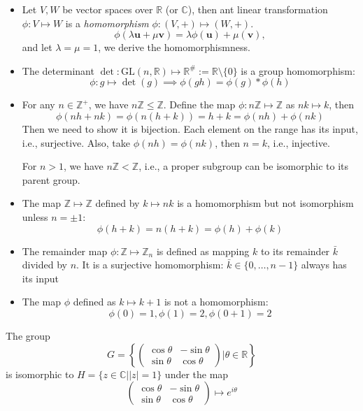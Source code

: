 \begin{example}
\begin{itemize}
\item
Let $V,W$ be vector spaces over $\mathbb{R}$ (or $\mathbb{C}$), then ant linear transformation $\phi: V\mapsto W$ is a \emph{homomorphism} $\phi: (V,+)\mapsto (W,+)$.
\[
\phi(\lambda\bm u+\mu\bm v) = \lambda\phi(\bm u)+\mu(\bm v),
\]
and let $\lambda=\mu=1$, we derive the homomorphismness.
\item
The determinant $\det:\mbox{GL}(n,\mathbb{R})\mapsto\mathbb{R}^{\#}:=\mathbb{R}\setminus\{0\}$ is a group homomorphism:
\[
\phi:g\mapsto\det(g)\implies
\phi(gh)=\phi(g)*\phi(h)
\]
\item
For any $n\in\mathbb{Z}^+$, we have $n\mathbb{Z}\le\mathbb{Z}$. Define the map $\phi:n\mathbb{Z}\mapsto\mathbb{Z}$ as $nk\mapsto k$, then
\[
\phi(nh+nk)=\phi(n(h+k))=h+k=\phi(nh)+\phi(nk)
\]
Then we need to show it is bijection. Each element on the range has its input, i.e., surjective. Also, take $\phi(nh)=\phi(nk)$, then $n=k$, i.e., injective.

For $n>1$, we have $n\mathbb{Z}<\mathbb{Z}$, i.e., a proper subgroup can be isomorphic to its parent group.
\item
The map $\mathbb{Z}\mapsto\mathbb{Z}$ defined by $k\mapsto nk$ is a homomorphism but not isomorphism unless $n=\pm1$:
\[
\phi(h+k)=n(h+k)=\phi(h)+\phi(k)
\]
\item
The remainder map $\phi:\mathbb{Z}\mapsto\mathbb{Z}_n$ is defined as mapping $k$ to its remainder $\bar k$divided by $n$. It is a surjective homomorphism: $\bar k\in\{0,\dots,n-1\}$ always has its input
\item
The map $\phi$ defined as $k\mapsto k+1$ is not a homomorphism:
\[
\phi(0)=1,\phi(1)=2,\phi(0+1)=2
\]

\end{itemize}
\end{example}
\begin{proposition}
The group
\[
G=\left\{\begin{pmatrix}
\cos\theta&-\sin\theta\\
\sin\theta&\cos\theta
\end{pmatrix}|\theta\in\mathbb{R}\right\}
\]
is isomorphic to $H=\{z\in\mathbb{C}||z|=1\}$ under the map 
\[\begin{pmatrix}
\cos\theta&-\sin\theta\\
\sin\theta&\cos\theta
\end{pmatrix}\mapsto e^{i\theta}
\]
\end{proposition}
